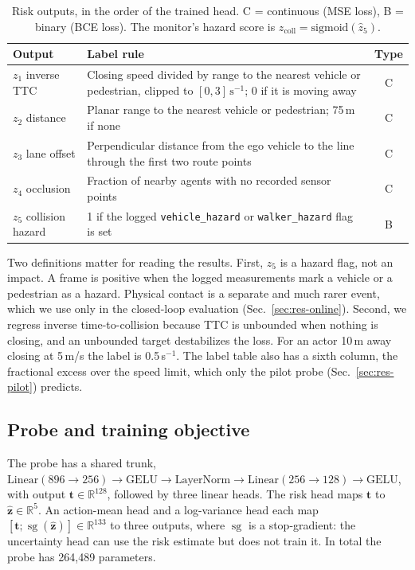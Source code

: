 \documentclass[conference]{IEEEtran}
\newcommand{\zcoll}{z_{\mathrm{coll}}}
\newcommand{\sg}{\operatorname{sg}}
\newcommand{\code}[1]{\texttt{\small #1}}
\begin{document}
\begin{table}[t]
\centering
\caption{Risk outputs, in the order of the trained head. C = continuous
(MSE loss), B = binary (BCE loss). The monitor's hazard score is
$\zcoll=\mathrm{sigmoid}(\hat z_5)$.}
\label{tab:z}
\footnotesize
\setlength{\tabcolsep}{3pt}
\begin{tabular}{@{}l p{5.3cm} c@{}}
\toprule
Output & Label rule & Type \\
\midrule
$z_1$ inverse TTC & Closing speed divided by range to the nearest vehicle or
pedestrian, clipped to $[0,3]\,\mathrm{s}^{-1}$; 0 if it is moving away & C \\
$z_2$ distance & Planar range to the nearest vehicle or pedestrian; 75\,m if none &
C \\
$z_3$ lane offset & Perpendicular distance from the ego vehicle to the line through
the first two route points & C \\
$z_4$ occlusion & Fraction of nearby agents with no recorded sensor points & C \\
$z_5$ collision hazard & 1 if the logged \code{vehicle\_hazard} or
\code{walker\_hazard} flag is set & B \\
\bottomrule
\end{tabular}
\end{table}

Two definitions matter for reading the results. First, $z_5$ is a hazard flag,
not an impact. A frame is positive when the logged measurements mark a vehicle or a
pedestrian as a hazard. Physical contact is a separate and much rarer event, which
we use only in the closed-loop evaluation (Sec.~\ref{sec:res-online}). Second, we
regress inverse time-to-collision because TTC is unbounded when nothing is closing,
and an unbounded target destabilizes the loss. For an actor 10\,m away closing at
5\,m/s the label is 0.5\,s$^{-1}$. The label table also has a sixth column, the
fractional excess over the speed limit, which only the pilot probe
(Sec.~\ref{sec:res-pilot}) predicts.

\subsection{Probe and training objective}

The probe has a shared trunk,
$\mathrm{Linear}(896{\to}256)\to\mathrm{GELU}\to\mathrm{LayerNorm}\to
\mathrm{Linear}(256{\to}128)\to\mathrm{GELU}$, with output $\mathbf{t}\in
\mathbb{R}^{128}$, followed by three linear heads. The risk head maps $\mathbf{t}$
to $\hat{\mathbf{z}}\in\mathbb{R}^5$. An action-mean head and a log-variance head
each map $[\mathbf{t};\sg(\hat{\mathbf{z}})]\in\mathbb{R}^{133}$ to three outputs,
where $\sg$ is a stop-gradient: the uncertainty head can use the risk estimate but
does not train it. In total the probe has 264{,}489 parameters.
\end{document}
